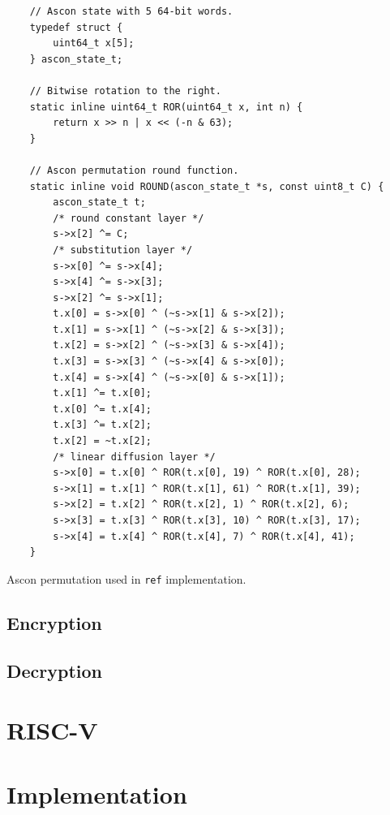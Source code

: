 \documentclass[11pt,twoside]{article}
\begin{document}
\begin{listing}[ht!]
  \begin{verbatim}
    // Ascon state with 5 64-bit words.
    typedef struct {
        uint64_t x[5];
    } ascon_state_t;

    // Bitwise rotation to the right.
    static inline uint64_t ROR(uint64_t x, int n) {
        return x >> n | x << (-n & 63);
    }

    // Ascon permutation round function.
    static inline void ROUND(ascon_state_t *s, const uint8_t C) {
        ascon_state_t t;
        /* round constant layer */
        s->x[2] ^= C;
        /* substitution layer */
        s->x[0] ^= s->x[4];
        s->x[4] ^= s->x[3];
        s->x[2] ^= s->x[1];
        t.x[0] = s->x[0] ^ (~s->x[1] & s->x[2]);
        t.x[1] = s->x[1] ^ (~s->x[2] & s->x[3]);
        t.x[2] = s->x[2] ^ (~s->x[3] & s->x[4]);
        t.x[3] = s->x[3] ^ (~s->x[4] & s->x[0]);
        t.x[4] = s->x[4] ^ (~s->x[0] & s->x[1]);
        t.x[1] ^= t.x[0];
        t.x[0] ^= t.x[4];
        t.x[3] ^= t.x[2];
        t.x[2] = ~t.x[2];
        /* linear diffusion layer */
        s->x[0] = t.x[0] ^ ROR(t.x[0], 19) ^ ROR(t.x[0], 28);
        s->x[1] = t.x[1] ^ ROR(t.x[1], 61) ^ ROR(t.x[1], 39);
        s->x[2] = t.x[2] ^ ROR(t.x[2], 1) ^ ROR(t.x[2], 6);
        s->x[3] = t.x[3] ^ ROR(t.x[3], 10) ^ ROR(t.x[3], 17);
        s->x[4] = t.x[4] ^ ROR(t.x[4], 7) ^ ROR(t.x[4], 41);
    }
  \end{verbatim}
  \caption{Ascon permutation used in \texttt{ref} implementation.}
  \label{lst:1}
\end{listing}

\subsection{Encryption}

\subsection{Decryption}

\section{RISC-V}

\section{Implementation}
\end{document}
